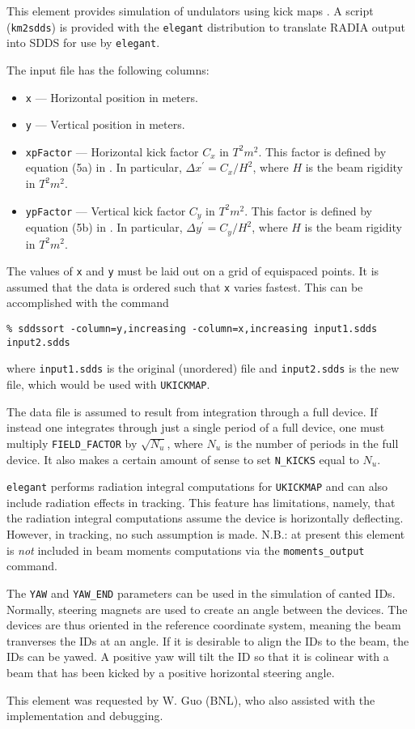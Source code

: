 This element provides simulation of undulators using kick maps \cite{Elleaume1992}.
A script (\verb|km2sdds|) is provided with the {\tt elegant}
distribution to translate RADIA \cite{radia} output into SDDS for use by
\verb|elegant|.

The input file has the following columns:
\begin{itemize}
\item \verb|x| --- Horizontal position in meters.
\item \verb|y| --- Vertical position in meters.
\item \verb|xpFactor| --- Horizontal kick factor $C_x$ in $T^2 m^2$.  This factor is defined by
equation (5a) in \cite{Elleaume1992}.  In particular, $\Delta x^\prime = C_x/H^2$, where
$H$ is the beam rigidity in  $T^2 m^2$.
\item \verb|ypFactor| --- Vertical kick factor $C_y$ in $T^2 m^2$. This factor is defined by
equation (5b) in \cite{Elleaume1992}.  In particular, $\Delta y^\prime = C_y/H^2$, where
$H$ is the beam rigidity in  $T^2 m^2$.
\end{itemize}
The values of \verb|x| and \verb|y| must be laid out on a grid of equispaced points.
It is assumed that the data is ordered such that \verb|x| varies fastest.  This can be
accomplished with the command
\begin{verbatim}
% sddssort -column=y,increasing -column=x,increasing input1.sdds input2.sdds
\end{verbatim}
where \verb|input1.sdds| is the original (unordered) file and \verb|input2.sdds| is the
new file, which would be used with \verb|UKICKMAP|.

The data file is assumed to result from integration through a full device. If instead one
integrates through just a single period of a full device, one must multiply \verb|FIELD_FACTOR|
by $\sqrt{N_u}$, where $N_u$ is the number of periods in the full device.  It also makes
a certain amount of sense to set \verb|N_KICKS| equal to $N_u$.

{\tt elegant} performs radiation integral computations
for \verb|UKICKMAP| and can also include radiation effects in
tracking.  This feature has limitations, namely, that the radiation
integral computations assume the device is horizontally deflecting.
However, in tracking, no such assumption is made.  N.B.: at present
this element is {\em not} included in beam moments
computations via the \verb|moments_output| command.

The \verb|YAW| and \verb|YAW_END| parameters can be used in the simulation of canted IDs.
Normally, steering magnets are used to create an angle between the devices.
The devices are thus oriented in the reference coordinate system, meaning the beam tranverses
the IDs at an angle.
If it is desirable to align the IDs to the beam, the IDs can be yawed. A positive yaw will
tilt the ID so that it is colinear with a beam that has been kicked by a positive horizontal
steering angle.

This element was requested by W. Guo (BNL), who also assisted with the
implementation and debugging.


